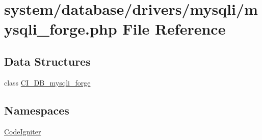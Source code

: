 \hypertarget{mysqli__forge_8php}{\section{system/database/drivers/mysqli/mysqli\-\_\-forge.php File Reference}
\label{mysqli__forge_8php}
}
\subsection*{Data Structures}
\begin{DoxyCompactItemize}
\item 
class \hyperlink{class_c_i___d_b__mysqli__forge}{C\-I\-\_\-\-D\-B\-\_\-mysqli\-\_\-forge}
\end{DoxyCompactItemize}
\subsection*{Namespaces}
\begin{DoxyCompactItemize}
\item 
\hyperlink{namespace_code_igniter}{Code\-Igniter}
\end{DoxyCompactItemize}
